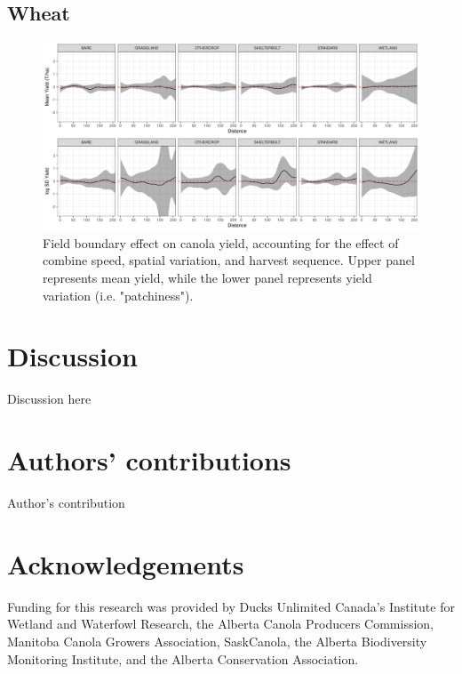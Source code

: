 \documentclass[]{elsarticle} %
\begin{document}
\hypertarget{wheat}{%
\subsection{Wheat}\label{wheat}}

\begin{figure}
\includegraphics[width=1\linewidth]{../Figures/ModelSummary3a_wheat} \caption{Field boundary effect on canola yield, accounting for the effect of combine speed, spatial variation, and harvest sequence. Upper panel represents mean yield, while the lower panel represents yield variation (i.e. "patchiness").}\label{fig:unnamed-chunk-2}
\end{figure}

\hypertarget{discussion}{%
\section{Discussion}\label{discussion}}

Discussion here

\hypertarget{authors-contributions}{%
\section{Authors' contributions}\label{authors-contributions}}

Author's contribution

\hypertarget{acknowledgements}{%
\section{Acknowledgements}\label{acknowledgements}}

Funding for this research was provided by Ducks Unlimited Canada's Institute for Wetland and Waterfowl Research, the Alberta Canola Producers Commission, Manitoba Canola Growers Association, SaskCanola, the Alberta Biodiversity Monitoring Institute, and the Alberta Conservation Association.
\end{document}
